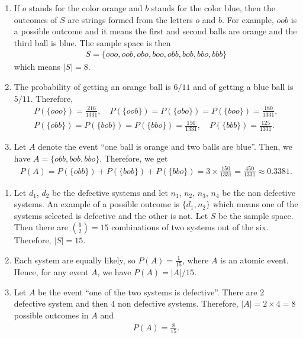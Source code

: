 	\begin{problem}
	\begin{enumerate}[label=\Circled{\arabic*}]
	\item If $o$ stands for the color orange and $b$ stands for the color blue, then the outcomes of $S$ are strings formed from the letters $o$ and $b$. For example, $oob$ is a possible outcome and it means the first and second balls are orange and the third ball is blue. The sample space is then
		\begin{align*}
		S = \{ ooo, oob, obo, boo, obb, bob, bbo, bbb \}
		\end{align*}
	which means $|S| = 8$.
	\item The probability of getting an orange ball is $6/11$ and of getting a blue ball is $5/11$. Therefore,
		\begin{align*}
		P (\{ ooo \}) = \frac{216}{1331} , \quad  P (\{ oob \}) = P ( \{ obo \}) = P (\{ boo \}) = \frac{180}{1331}, \\
		 P (\{ obb \}) = P (\{ bob \}) = P (\{ bbo \}) = \frac{150}{1331} , \quad P (\{ bbb \}) = \frac{125}{1331} .
		\end{align*}
	\item Let $A$ denote the event ``one ball is orange and two balls are blue''. Then, we have $A = \{ obb , bob, bbo \}$. Therefore, we get
		\begin{align*}
		P (A) = P (\{ obb \}) + P (\{ bob \}) + P (\{ bbo \}) = 3 \times \frac{150}{1331} = \frac{450}{1331} \approx 0.3381 . \tag*{$\triangle$}
		\end{align*}
	\end{enumerate}
	\end{problem}
	
	\begin{problem}
	\begin{enumerate}[label=\Circled{\arabic*}]
	\item Let $d_1$, $d_2$ be the defective systems and let $n_1$, $n_2$, $n_3$, $n_4$ be the non defective systems. An example of a possible outcome is $\{ d_1 , n_2 \}$ which means one of the systems selected is defective and the other is not. Let $S$ be the sample space. Then there are $\binom{6}{2} = 15$ combinations of two systems out of the six. Therefore, $|S| = 15$.
	\item Each system are equally likely, so $P (A) = \frac{1}{15}$, where $A$ is an atomic event. Hence, for any event $A$, we have $P (A) = |A| / 15$.
	\item Let $A$ be the event ``one of the two systems is defective''. There are $2$ defective system and then $4$ non defective systems. Therefore, $|A| = 2 \times 4 = 8$ possible outcomes in $A$ and 
		\begin{align*}
		P (A) = \frac{8}{15} . \tag*{$\triangle$}
		\end{align*}
	\end{enumerate}
	\end{problem}
	
